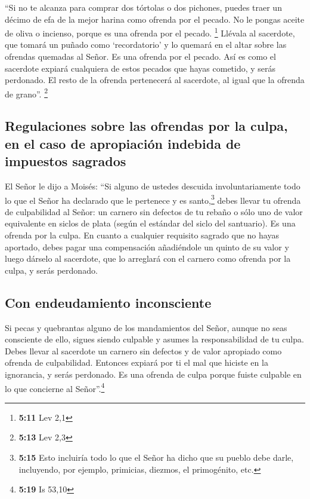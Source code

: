  ``Si no te alcanza para comprar dos tórtolas o dos
pichones, puedes traer un décimo de efa de la mejor harina como ofrenda
por el pecado. No le pongas aceite de oliva o incienso, porque es una
ofrenda por el pecado. \footnote{\textbf{5:11} Lev 2,1} 
Llévala al sacerdote, que tomará un puñado como `recordatorio' y lo
quemará en el altar sobre las ofrendas quemadas al Señor. Es una ofrenda
por el pecado.  Así es como el sacerdote expiará
cualquiera de estos pecados que hayas cometido, y serás perdonado. El
resto de la ofrenda pertenecerá al sacerdote, al igual que la ofrenda de
grano''. \footnote{\textbf{5:13} Lev 2,3}

\hypertarget{regulaciones-sobre-las-ofrendas-por-la-culpa-en-el-caso-de-apropiaciuxf3n-indebida-de-impuestos-sagrados}{%
\subsection{Regulaciones sobre las ofrendas por la culpa, en el caso de
apropiación indebida de impuestos
sagrados}\label{regulaciones-sobre-las-ofrendas-por-la-culpa-en-el-caso-de-apropiaciuxf3n-indebida-de-impuestos-sagrados}}

 El Señor le dijo a Moisés:  ``Si alguno
de ustedes descuida involuntariamente todo lo que el Señor ha declarado
que le pertenece y es santo,\footnote{\textbf{5:15} Esto incluiría todo
  lo que el Señor ha dicho que su pueblo debe darle, incluyendo, por
  ejemplo, primicias, diezmos, el primogénito, etc.} debes llevar tu
ofrenda de culpabilidad al Señor: un carnero sin defectos de tu rebaño o
sólo uno de valor equivalente en siclos de plata (según el estándar del
siclo del santuario). Es una ofrenda por la culpa.  En
cuanto a cualquier requisito sagrado que no hayas aportado, debes pagar
una compensación añadiéndole un quinto de su valor y luego dárselo al
sacerdote, que lo arreglará con el carnero como ofrenda por la culpa, y
serás perdonado.

\hypertarget{con-endeudamiento-inconsciente}{%
\subsection{Con endeudamiento
inconsciente}\label{con-endeudamiento-inconsciente}}

 Si pecas y quebrantas alguno de los mandamientos del
Señor, aunque no seas consciente de ello, sigues siendo culpable y
asumes la responsabilidad de tu culpa.  Debes llevar al
sacerdote un carnero sin defectos y de valor apropiado como ofrenda de
culpabilidad. Entonces expiará por ti el mal que hiciste en la
ignorancia, y serás perdonado.  Es una ofrenda de culpa
porque fuiste culpable en lo que concierne al Señor''.\footnote{\textbf{5:19}
  Is 53,10}

